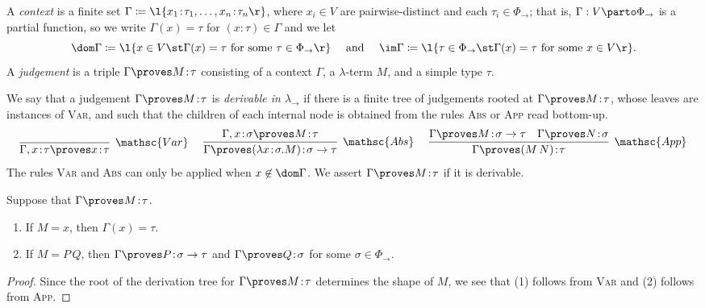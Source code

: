 \documentclass[reqno]{amsart}
\begin{document}
    \begin{definition}
        A \textit{context} is a finite set $\Gamma\coloneqq\l\{x_1\!:\!\tau_1,\dots,x_n\!:\!\tau_n\r\}$, where $x_i\in V$ are pairwise-distinct and each $\tau_i\in\Phi_\rightarrow$; that is, $\Gamma:V\parto\Phi_\rightarrow$ is a partial function, so we write $\Gamma(x)=\tau$ for $(x\!:\!\tau)\in\Gamma$ and we let
        \begin{equation*}
            \dom\Gamma\coloneqq\l\{x\in V\st\Gamma(x)=\tau\textrm{ for some }\tau\in\Phi_\rightarrow\r\}\ \ \ \ \textrm{and}\ \ \ \ \im\Gamma\coloneqq\l\{\tau\in\Phi_\rightarrow\st\Gamma(x)=\tau\textrm{ for some }x\in V\r\}.
        \end{equation*}
        A \textit{judgement} is a triple $\Gamma\proves M\!:\!\tau$ consisting of a context $\Gamma$, a $\lambda$-term $M$, and a simple type $\tau$.
    \end{definition}

    \begin{definition}
        We say that a judgement $\Gamma\proves M\!:\!\tau$ is \textit{derivable in $\lambda_\rightarrow$} if there is a finite tree of judgements rooted at $\Gamma\proves M\!:\!\tau$, whose leaves are instances of \textsc{Var}, and such that the children of each internal node is obtained from the rules \textsc{Abs} or \textsc{App} read bottom-up.
        \begin{equation*}
            \infer[\mathsc{Var}]{\Gamma,x\!:\!\tau\proves x\!:\!\tau}{}\ \ \ \ 
            \infer[\mathsc{Abs}]{\Gamma\proves(\lambda x\!:\!\sigma.M)\!:\!\sigma\rightarrow\tau}{\Gamma,x\!:\!\sigma\proves M\!:\!\tau}\ \ \ \ 
            \infer[\mathsc{App}]{\Gamma\proves(M\,N)\!:\!\tau}{
                \Gamma\proves M\!:\!\sigma\rightarrow\tau &
                \Gamma\proves N\!:\!\sigma
            }
        \end{equation*}
        The rules \textsc{Var} and \textsc{Abs} can only be applied when $x\not\in\dom\Gamma$. We assert $\Gamma\proves M\!:\!\tau$ if it is derivable.
    \end{definition}

    \begin{lemma}\label{lem:simply_typed_generation_1}
        Suppose that $\Gamma\proves M\!:\!\tau$.
        \begin{enumerate}
            \item If $M=x$, then $\Gamma(x)=\tau$.
            \item If $M=P\,Q$, then $\Gamma\proves P\!:\!\sigma\rightarrow\tau$ and $\Gamma\proves Q\!:\!\sigma$ for some $\sigma\in\Phi_\rightarrow$.
        \end{enumerate}
    \end{lemma}
    \begin{proof}
        Since the root of the derivation tree for $\Gamma\proves M\!:\!\tau$ determines the shape of $M$, we see that (1) follows from \textsc{Var} and (2) follows from \textsc{App}.
    \end{proof}
\end{document}
